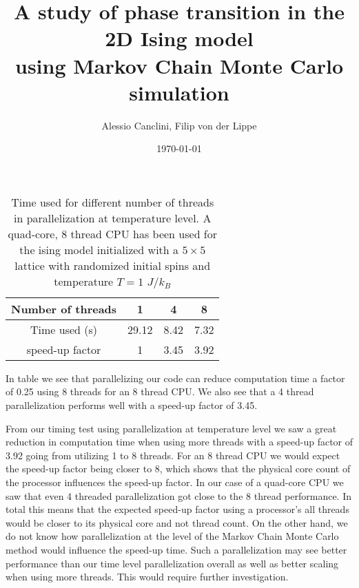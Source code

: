 \documentclass[english,notitlepage,reprint,nofootinbib]{revtex4-1}  %
\begin{document}
\title{A study of phase transition in the 2D Ising model\\using Markov Chain Monte Carlo simulation}  %
\author{Alessio Canclini, Filip von der Lippe} %
\date{\today}                             %
\noaffiliation                            %



\begin{table}
    \centering
    \caption{Time used for different number of threads in parallelization at temperature level. A quad-core, 8 thread CPU has been used for the ising model initialized with a $5\times5$ lattice with randomized initial spins and temperature $T= 1$ $J/k_B$}
    \label{tab:timing}
    \begin{tabular}{|c|c|c|c|}
        \hline
        Number of threads & 1     & 4    & 8    \\
        \hline
        Time used (s)     & 29.12 & 8.42 & 7.32 \\
        \hline
        speed-up factor   & 1     & 3.45 & 3.92 \\
        \hline
    \end{tabular}
\end{table}
In table  we see that parallelizing our code can reduce computation time a factor of 0.25 using 8 threads for an 8 thread CPU. We also see that a 4 thread parallelization performs well with a speed-up factor of 3.45.

From our timing test using parallelization at temperature level we saw a great reduction in computation time when using more threads with a speed-up factor of 3.92 going from utilizing 1 to 8 threads. For an 8 thread CPU we would expect the speed-up factor being closer to 8, which shows that the physical core count of the processor influences the speed-up factor. In our case of a quad-core CPU we saw that even 4 threaded parallelization got close to the 8 thread performance. In total this means that the expected speed-up factor using a processor's all threads would be closer to its physical core and not thread count. On the other hand, we do not know how parallelization at the level of the Markov Chain Monte Carlo method would influence the speed-up time. Such a parallelization may see better performance than our time level parallelization overall as well as better scaling when using more threads. This would require further investigation.
\end{document}
